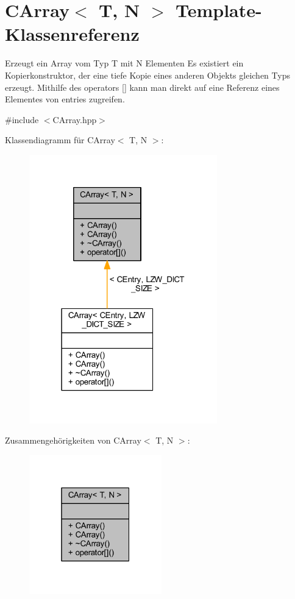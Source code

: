 \hypertarget{class_c_array}{}\section{C\+Array$<$ T, N $>$ Template-\/\+Klassenreferenz}
\label{class_c_array}


Erzeugt ein Array vom Typ T mit N Elementen Es existiert ein Kopierkonstruktor, der eine tiefe Kopie eines anderen Objekts gleichen Typs erzeugt. Mithilfe des operators \mbox{[}\mbox{]} kann man direkt auf eine Referenz eines Elementes von entries zugreifen.  




{\ttfamily \#include $<$C\+Array.\+hpp$>$}



Klassendiagramm für C\+Array$<$ T, N $>$\+:
\nopagebreak
\begin{figure}[H]
\begin{center}
\leavevmode
\includegraphics[width=231pt]{class_c_array__inherit__graph}
\end{center}
\end{figure}


Zusammengehörigkeiten von C\+Array$<$ T, N $>$\+:
\nopagebreak
\begin{figure}[H]
\begin{center}
\leavevmode
\includegraphics[width=163pt]{class_c_array__coll__graph}
\end{center}
\end{figure}
